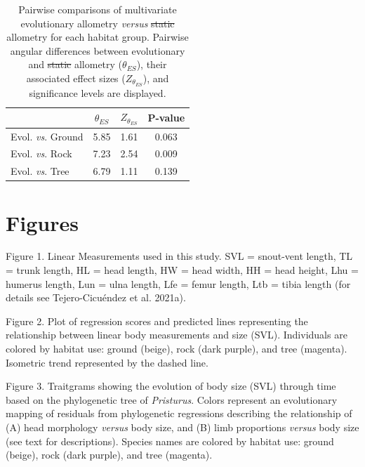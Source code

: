 \documentclass[
  11pt,
]{article}
\providecommand{\DIFaddtex}[1]{{\protect\color{blue}\uwave{#1}}} %
\providecommand{\DIFdeltex}[1]{{\protect\color{red}\sout{#1}}}                      %
\providecommand{\DIFaddFL}[1]{\DIFadd{#1}} %
\providecommand{\DIFdelFL}[1]{\DIFdel{#1}} %
\providecommand{\DIFaddbeginFL}{} %
\providecommand{\DIFaddendFL}{} %
\providecommand{\DIFdelbeginFL}{} %
\providecommand{\DIFdelendFL}{} %
\providecommand{\DIFadd}[1]{\texorpdfstring{\DIFaddtex{#1}}{#1}} %
\providecommand{\DIFdel}[1]{\texorpdfstring{\DIFdeltex{#1}}{}} %
\newcommand{\DIFscaledelfig}{0.5}
\newlength{\DIFdelgraphicswidth} %
\newlength{\DIFdelgraphicsheight} %
\newcommand{\DIFaddincludegraphics}[2][]{{\color{blue}\fbox{\DIFOincludegraphics[#1]{#2}}}} %
\newcommand{\DIFdelincludegraphics}[2][]{%
\sbox{\DIFdelgraphicsbox}{\DIFOincludegraphics[#1]{#2}}%
\settoboxwidth{\DIFdelgraphicswidth}{\DIFdelgraphicsbox} %
\settoboxtotalheight{\DIFdelgraphicsheight}{\DIFdelgraphicsbox} %
\scalebox{\DIFscaledelfig}{%
\parbox[b]{\DIFdelgraphicswidth}{\usebox{\DIFdelgraphicsbox}\\[-\baselineskip] \rule{\DIFdelgraphicswidth}{0em}}\llap{\resizebox{\DIFdelgraphicswidth}{\DIFdelgraphicsheight}{%
\setlength{\unitlength}{\DIFdelgraphicswidth}%
\begin{picture}(1,1)%
\thicklines\linethickness{2pt} %
{\color[rgb]{1,0,0}\put(0,0){\framebox(1,1){}}}%
{\color[rgb]{1,0,0}\put(0,0){\line( 1,1){1}}}%
{\color[rgb]{1,0,0}\put(0,1){\line(1,-1){1}}}%
\end{picture}%
}\hspace*{3pt}}} %
} %
\DeclareRobustCommand{\DIFaddbeginFL}{\DIFOaddbeginFL \let\includegraphics\DIFaddincludegraphics} %
\DeclareRobustCommand{\DIFaddendFL}{\DIFOaddendFL \let\includegraphics\DIFOincludegraphics} %
\DeclareRobustCommand{\DIFdelbeginFL}{\DIFOdelbeginFL \let\includegraphics\DIFdelincludegraphics} %
\DeclareRobustCommand{\DIFdelendFL}{\DIFOaddendFL \let\includegraphics\DIFOincludegraphics} %
\begin{document}
\newpage

\begin{table}[H]

\caption{\DIFdelbeginFL %
\DIFdelendFL \DIFaddbeginFL \label{tab:unnamed-chunk-4}\DIFaddendFL Pairwise comparisons of multivariate evolutionary allometry \textit{versus} \DIFdelbeginFL \DIFdelFL{static }\DIFdelendFL \DIFaddbeginFL \DIFaddFL{intraspecific }\DIFaddendFL allometry for each habitat group. Pairwise angular differences between evolutionary and \DIFdelbeginFL \DIFdelFL{static }\DIFdelendFL \DIFaddbeginFL \DIFaddFL{intraspecific }\DIFaddendFL allometry ($\theta_{ES}$), their associated effect sizes ($Z_{\theta_{ES}}$), and significance levels are displayed.}
\centering
\begin{tabular}[t]{lccc}
\toprule
  & $\theta_{ES}$ & $Z_{\theta_{ES}}$ & P-value\\
\midrule
Evol. \textit{vs}. Ground & 5.85 & 1.61 & 0.063\\
Evol. \textit{vs}. Rock & 7.23 & 2.54 & 0.009\\
Evol. \textit{vs}. Tree & 6.79 & 1.11 & 0.139\\
\bottomrule
\end{tabular}
\end{table}

\newpage

\hypertarget{figures}{%
\section{Figures}\label{figures}}

Figure 1. Linear Measurements used in this study. SVL = snout-vent
length, TL = trunk length, HL = head length, HW = head width, HH = head
height, Lhu = humerus length, Lun = ulna length, Lfe = femur length, Ltb
= tibia length (for details see Tejero-Cicuéndez et al. 2021a).

Figure 2. Plot of regression scores and predicted lines representing the
relationship between linear body measurements and size (SVL).
Individuals are colored by habitat use: ground (beige), rock (dark
purple), and tree (magenta). Isometric trend represented by the dashed
line.

Figure 3. Traitgrams showing the evolution of body size (SVL) through
time based on the phylogenetic tree of \emph{Pristurus}. Colors
represent an evolutionary mapping of residuals from phylogenetic
regressions describing the relationship of (A) head morphology
\emph{versus} body size, and (B) limb proportions \emph{versus} body
size (see text for descriptions). Species names are colored by habitat
use: ground (beige), rock (dark purple), and tree (magenta).
\end{document}
